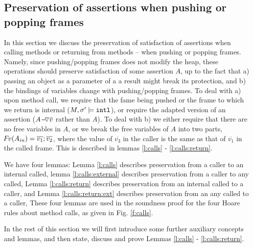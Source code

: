 


\subsection{Preservation of assertions when pushing or popping frames}

In this section we  discuss the preservation of satisfaction of assertions when calling methods or returning from methods -- \ie when pushing or popping  frames. 
Namely, since  pushing/popping frames  does not modify the heap, these operations should preserve satisfaction of some assertion $A$, up to the fact that a) passing an object as a parameter of a a result might break its protection, and 
b) the bindings of variables change  with pushing/popping frames.
To deal with a)  upon method call, 
we   require that the fame being pushed or the frame to which we return is internal ($M, \sigma' \models \intThis$), or require the adapted version of an assertion (\ie  ${\PushAS  {v} { A}}$ rather than $A$).
To deal with b) we either require that there are no free variables in $A$, or we break the free variables of $A$ into two parts, \ie $\fv(\Ain) =  \overline{v_1};\overline{v_2}$, where the value of $\overline{v_3}$ in the caller is the same as that of  $\overline{v_1}$ in the called frame.
This   is described in  lemmas \ref{l:calls} -  \ref{l:calls:return}.

We have four lemmas: Lemma \ref{l:calls} describes preservation from a caller to an internal called, lemma \ref{l:calls:external}
describes preservation from a caller to any called, Lemma \ref{l:calls:return} describes preservation from an internal called to a caller, and  Lemma \ref{l:calls:return:ext} describes preservation from an any called to a caller, 
These four lemmas are used in the soundness proof for the four Hoare rules   about method calls, as given in Fig. \ref{f:calls}. 

In the rest of this  section we will first introduce some further auxiliary concepts and lemmas, 
and then state, discuss  and  prove Lemmas \ref{l:calls} -  \ref{l:calls:return}.  

